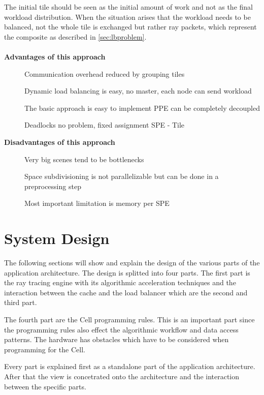 \documentclass[DIV10, abstracton, openright, footsepline, headsepline, twoside, 9pt,
bigheadings]{scrreprt}
\begin{document}
The initial tile should be seen as the initial amount of work and not as the final
workload distribution. When the situation arises that the workload needs to be
balanced, not the whole tile is exchanged but rather ray packets, which represent the
 composite as described in \ref{sec:lbproblem}.\\\\
\textbf{Advantages of this approach}
\begin{description}
\item[\color{Bigblue}{$\triangleright$}] Communication overhead reduced by
  grouping tiles
\item[\color{Bigblue}{$\triangleright$}] Dynamic load balancing is easy, no
  master, each node can
send workload
\item[\color{Bigblue}{$\triangleright$}] The basic approach is easy to implement
  PPE can be
completely decoupled
\item[\color{Bigblue}{$\triangleright$}] Deadlocks no problem, fixed assignment
  SPE - Tile
\end{description}
\textbf{Disadvantages of this approach}
\begin{description}
\item[\color{Bigblue}{$\triangleright$}] Very big scenes tend to be bottlenecks
\item[\color{Bigblue}{$\triangleright$}] Space subdivisioning is not
  parallelizable but can be
done in a preprocessing step
\item[\color{Bigblue}{$\triangleright$}] Most important limitation is memory per
  SPE
\end{description}

\chapter{System Design}
The following sections will show and explain the design of the various parts
of the application architecture. The design is splitted into four parts. The first
part is the ray tracing engine with its algorithmic acceleration techniques
and the interaction between the cache and the load balancer which are the second
and third part.

The fourth part are the Cell programming rules. This is an important part since
the programming rules also effect the algorithmic workflow and data access
patterns. The hardware has obstacles which have to be considered when programming
for the Cell.

Every part is explained first as a standalone part of the application
architecture. After that the view is concetrated onto the architecture and the
interaction between the specific parts.
\end{document}
